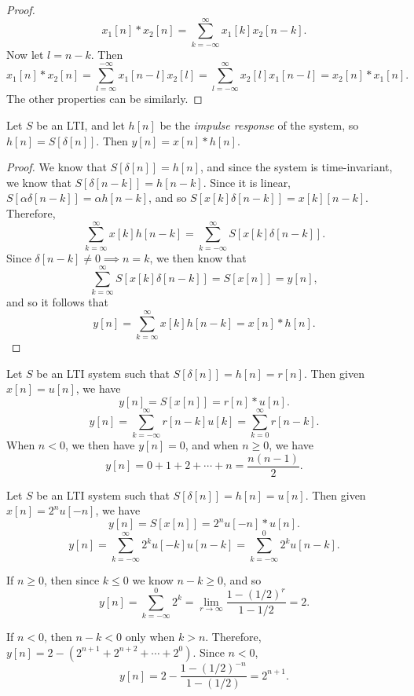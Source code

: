 \begin{proof}
    \[x_1[n]*x_2[n] = \sum_{k=-\infty}^{\infty}x_1[k]x_2[n-k].\] Now let $l = n-k$. Then \[x_1[n]*x_2[n] = \sum_{l=\infty}^{-\infty}x_1[n-l]x_2[l] = \sum_{l=-\infty}^{\infty}x_2[l]x_1[n-l] = x_2[n]*x_1[n].\] The other properties can be similarly.
\end{proof}

\begin{prop}
    Let $S$ be an LTI, and let $h[n]$ be the \emph{impulse response} of the system, so $h[n] = S[\delta[n]]$. Then $y[n] = x[n] * h[n]$.
\end{prop}

\begin{proof}
    We know that $S[\delta[n]] = h[n]$, and since the system is time-invariant, we know that $S[\delta[n - k]] = h[n - k]$. Since it is linear, $S[\alpha\delta[n - k]] =\alpha h[n-k]$, and so $S[x[k]\delta[n-k]] = x[k][n-k]$. Therefore, \[\sum_{k=\infty}^{\infty}x[k]h[n-k] = \sum_{k=-\infty}^{\infty}S[x[k]\delta[n-k]].\] Since $\delta[n-k] \neq 0 \implies n=k$, we then know that \[\sum_{k=\infty}^{\infty}S[x[k]\delta[n-k]] = S[x[n]] = y[n],\] and so it follows that
    \[y[n] = \sum_{k=\infty}^{\infty}x[k]h[n-k] = x[n]*h[n].\]
\end{proof}

\begin{exmp}
    Let $S$ be an LTI system such that $S[\delta[n]] = h[n] = r[n]$. Then given $x[n] = u[n]$, we have \[y[n] = S[x[n]] = r[n]*u[n].\]
    \[y[n] = \sum_{k=-\infty}^{\infty}r[n-k]u[k] = \sum_{k=0}^{\infty}r[n-k].\] When $n < 0$, we then have $y[n] = 0$, and when $n \geq 0$, we have \[y[n] = 0 + 1 + 2 + \cdots + n = \frac{n(n-1)}{2}.\]
\end{exmp}

\begin{exmp}
    Let $S$ be an LTI system such that $S[\delta[n]] = h[n] = u[n]$. Then given $x[n] = 2^{n}u[-n]$, we have \[y[n] = S[x[n]] = 2^{n}u[-n]*u[n].\]
    \[y[n] = \sum_{k=-\infty}^{\infty}2^{k}u[-k]u[n-k] = \sum_{k=-\infty}^{0}2^{k}u[n-k].\]

    If $n \geq 0$, then since $k \leq 0$ we know $n - k \geq 0$, and so
    \[y[n] = \sum_{k=-\infty}^{0}2^k = \lim_{r\to\infty}\frac{1-(1/2)^{r}}{1-1/2} = 2.\]

    If $n < 0$, then $n-k < 0$ only when $k > n$. Therefore, $y[n] = 2 - \left(2^{n+1} + 2^{n+2} + \cdots + 2^0\right)$. Since $n < 0$, \[y[n] = 2 - \frac{1-(1/2)^{-n}}{1-(1/2)} = 2^{n+1}.\]
\end{exmp}

